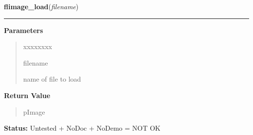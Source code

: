     \label{xformslib:library:flimage_load}

    \vspace{0.5ex}

\hspace{.8\funcindent}\begin{boxedminipage}{\funcwidth}

    \raggedright \textbf{flimage\_load}(\textit{filename})

    \vspace{-1.5ex}

    \rule{\textwidth}{0.5\fboxrule}
\setlength{\parskip}{2ex}
\setlength{\parskip}{1ex}
      \textbf{Parameters}
      \vspace{-1ex}

      \begin{quote}
        \begin{Ventry}{xxxxxxxx}

          \item[filename]

          name of file to load

        \end{Ventry}

      \end{quote}

      \textbf{Return Value}
    \vspace{-1ex}

      \begin{quote}
      pImage

      \end{quote}

\textbf{Status:} Untested + NoDoc + NoDemo = NOT OK



    \end{boxedminipage}

    \label{xformslib:library:flimage_read}

    \vspace{0.5ex}

